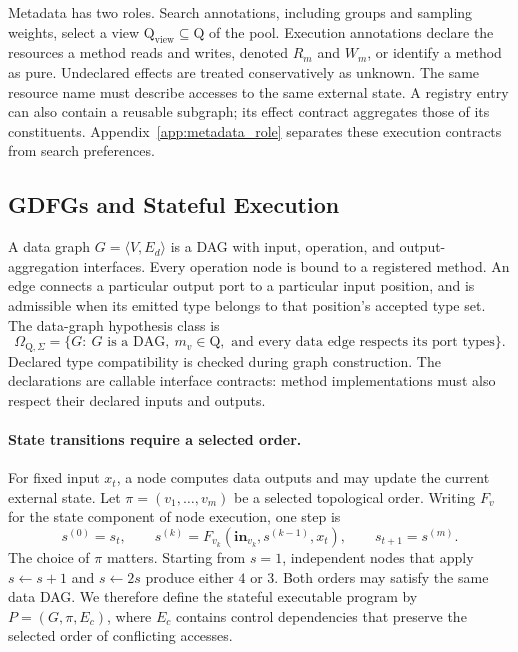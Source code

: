 Metadata has two roles. Search annotations, including groups and sampling weights, select a view $\mathrm{Q}_{\mathrm{view}}\subseteq\mathrm{Q}$ of the pool. Execution annotations declare the resources a method reads and writes, denoted $R_m$ and $W_m$, or identify a method as pure. Undeclared effects are treated conservatively as unknown. The same resource name must describe accesses to the same external state. A registry entry can also contain a reusable subgraph; its effect contract aggregates those of its constituents. Appendix~\ref{app:metadata_role} separates these execution contracts from search preferences.

\subsection{GDFGs and Stateful Execution}
\label{sec:gdfg}
A data graph $G=\langle V,E_d\rangle$ is a DAG with input, operation, and output-aggregation interfaces. Every operation node is bound to a registered method. An edge connects a particular output port to a particular input position, and is admissible when its emitted type belongs to that position's accepted type set. The data-graph hypothesis class is
\begin{equation}
\label{eq:expression_space}
\Omega_{\mathrm Q,\Sigma}=\{G:\ G\text{ is a DAG},\ m_v\in\mathrm Q,
\text{ and every data edge respects its port types}\}.
\end{equation}
Declared type compatibility is checked during graph construction. The declarations are callable interface contracts: method implementations must also respect their declared inputs and outputs.

\paragraph{State transitions require a selected order.}
For fixed input $x_t$, a node computes data outputs and may update the current external state. Let $\pi=(v_1,\ldots,v_m)$ be a selected topological order. Writing $F_v$ for the state component of node execution, one step is
\begin{equation}
\label{eq:state_transition}
s^{(0)}=s_t,\qquad
s^{(k)}=F_{v_k}(\mathbf{in}_{v_k},s^{(k-1)},x_t),\qquad
s_{t+1}=s^{(m)}.
\end{equation}
The choice of $\pi$ matters. Starting from $s=1$, independent nodes that apply $s\leftarrow s+1$ and $s\leftarrow2s$ produce either $4$ or $3$. Both orders may satisfy the same data DAG. We therefore define the stateful executable program by $P=(G,\pi,E_c)$, where $E_c$ contains control dependencies that preserve the selected order of conflicting accesses.

